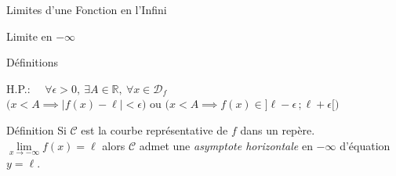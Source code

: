 \documentclass{coursbook}
\begin{document}
\begin{Gpartie}{Limites d'une Fonction en l'Infini}
\begin{Spartie}{Limite en $-\infty$}
\begin{SSpartie}{Définitions}
\begin{itemize}
\begin{center}
                        \parbox{\linewidth}{}
                    \end{center}
                    \vspace*{2ex}
                    H.P.: $\quad\forall\epsilon >0,~\exists A\in\mathbb{R},~\forall x\in\mathcal{D}_f$ \\ \phantom{H.P.: \quad}$\bigg(x<A\implies\left\lvert f(x)-\ell\right\rvert <\epsilon\bigg)$ ou $\bigg(x<A\implies f(x)\in\big]\ell-\epsilon\,;\ell+\epsilon\big[\bigg)$
                \end{itemize}
            \end{SSpartie}
            \begin{SSpartie}{Définition} 
                Si $\mathcal{C}$ est la courbe représentative de $f$ dans un repère. $\lim\limits_{x\to-\infty}f(x)=\ell$ alors $\mathcal{C}$ admet une \emph{asymptote horizontale} en $-\infty$ d'équation $y=\ell$.
            \end{SSpartie}
        \end{Spartie}
    \end{Gpartie}
    \pagebreak
\end{document}
